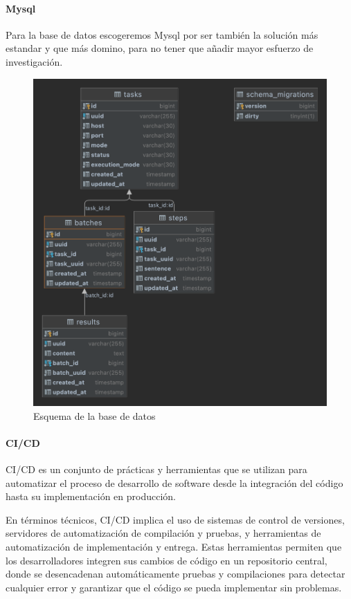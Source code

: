 \paragraph{Mysql}\label{par:mysql}
    Para la base de datos escogeremos Mysql por ser también la solución más estandar y que más domino, para no tener que añadir mayor esfuerzo de investigación.
    \begin{figure}[H]
        \centering
        \includegraphics[scale = 0.15]{part/Proyecto_ejecutivo/memoria_constructiva/dbSchema}
        \caption{Esquema de la base de datos}\label{fig:Esquema de la base de datos}
    \end{figure}
\paragraph{CI/CD}\label{par:cicd}
CI/CD es un conjunto de prácticas y herramientas que se utilizan para automatizar el proceso de desarrollo de software desde la integración del código hasta su implementación en producción.

En términos técnicos, CI/CD implica el uso de sistemas de control de versiones, servidores de automatización de compilación y pruebas, y herramientas de automatización de implementación y entrega. Estas herramientas permiten que los desarrolladores integren sus cambios de código en un repositorio central, donde se desencadenan automáticamente pruebas y compilaciones para detectar cualquier error y garantizar que el código se pueda implementar sin problemas.


